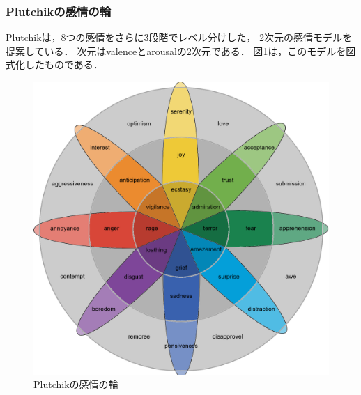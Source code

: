 		\subsubsection{Plutchikの感情の輪}
			Plutchik\cite{plutchik}は，8つの感情をさらに3段階でレベル分けした，
			2次元の感情モデルを提案している．
			次元はvalenceとarousalの2次元である．
			図\ref{fig:plutchik}は，このモデルを図式化したものである．
			\begin{figure}[H]
				\centering
				\includegraphics[width=\linewidth]{./figure/plutchik.png}
				\caption{Plutchikの感情の輪}
				\label{fig:plutchik}
			\end{figure}
			

